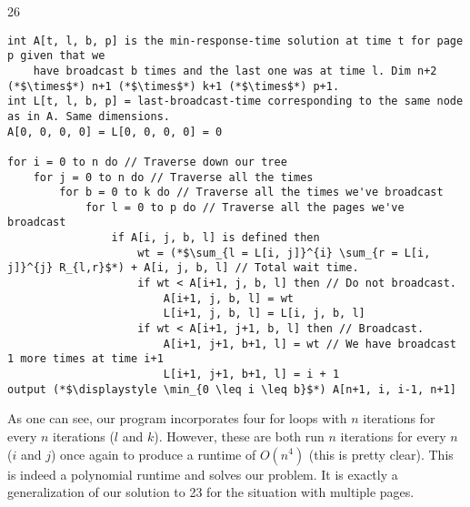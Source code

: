 \documentclass{article}
\begin{document}
\begin{prob} {26}
	\pagebreak
	\begin{lstlisting}
int A[t, l, b, p] is the min-response-time solution at time t for page p given that we
    have broadcast b times and the last one was at time l. Dim n+2 (*$\times$*) n+1 (*$\times$*) k+1 (*$\times$*) p+1.
int L[t, l, b, p] = last-broadcast-time corresponding to the same node as in A. Same dimensions.
A[0, 0, 0, 0] = L[0, 0, 0, 0] = 0

for i = 0 to n do // Traverse down our tree
    for j = 0 to n do // Traverse all the times
        for b = 0 to k do // Traverse all the times we've broadcast
            for l = 0 to p do // Traverse all the pages we've broadcast
                if A[i, j, b, l] is defined then
                    wt = (*$\sum_{l = L[i, j]}^{i} \sum_{r = L[i, j]}^{j} R_{l,r}$*) + A[i, j, b, l] // Total wait time.
                    if wt < A[i+1, j, b, l] then // Do not broadcast.
                        A[i+1, j, b, l] = wt
                        L[i+1, j, b, l] = L[i, j, b, l]
                    if wt < A[i+1, j+1, b, l] then // Broadcast.
                        A[i+1, j+1, b+1, l] = wt // We have broadcast 1 more times at time i+1
                        L[i+1, j+1, b+1, l] = i + 1
output (*$\displaystyle \min_{0 \leq i \leq b}$*) A[n+1, i, i-1, n+1]
	\end{lstlisting}

	As one can see, our program incorporates four for loops with $n$ iterations for every $n$ iterations ($l$ and $k$).  However, these are both run $n$ iterations for every $n$ ($i$ and $j$) once again to produce a runtime of $O(n^4)$ (this is pretty clear). This is indeed a polynomial runtime and solves our problem. It is exactly a generalization of our solution to 23 for the situation with multiple pages. 

\end{prob}
\end{document}
